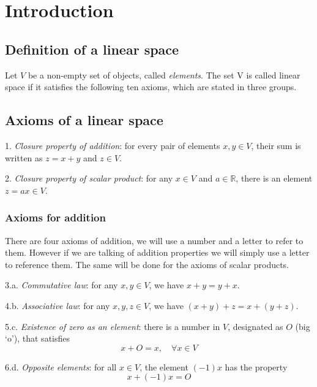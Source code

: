 \documentclass{book}
\begin{document}
\mainmatter

\chapter{Introduction}
\section{Definition of a linear space}
Let $V$ be a non-empty set of objects, called \textit{elements}. The set V is
called linear space if it satisfies the following ten axioms, which are stated
in three groups.

\section*{Axioms of a linear space}

\begin{list}{Axiom}{}
    \item 1.\textit{ Closure property of addition}: for every pair of elements $x,y\in V$, their sum is written as $z=x+y$ and $z\in V$.
    \item 2.\textit{ Closure property of scalar product}: for any $x\in V$ and $a\in\mathbb R$, there is an element $z=ax\in V$.
\end{list}

\subsection*{Axioms for addition}

There are four axioms of addition, we will use a number and a letter to refer
to them. However if we are talking of addition properties we will simply use a
letter to reference them. The same will be done for the axioms of scalar
products.

\begin{list}{Axiom}{}
    \item 3.a.\textit{ Commutative law}: for any $x,y\in V$, we have $x+y = y+x$.
    \item 4.b.\textit{ Associative law}: for any $x,y,z\in V$, we have $(x+y) + z = x + (y + z)$.
    \item 5.c.\textit{ Existence of zero as an element}: there is a number in $V$, designated as $O$ (big `o'), that satisfies
          \[
              x + O = x,\quad \forall x \in V
          \]

    \item 6.d.\textit{ Opposite elements}: for all $x\in V$, the element $(-1)x$ has the property
          \[
              x + (-1)x = O
          \]
\end{list}
\end{document}
